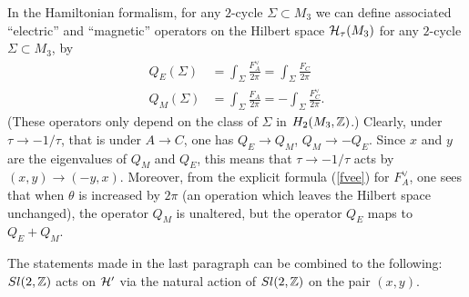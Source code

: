 In the Hamiltonian formalism, for any $2$-cycle $\Sigma\subset M_3$
we can define associated ``electric'' and ``magnetic'' operators on the
Hilbert space ${\cal H}_\tau(M_3)$ for any $2$-cycle $\Sigma\subset M_3$,
by
\begin{equation}
\begin{aligned}
Q_E(\Sigma) &= \int_\Sigma \frac{F_A^\vee}{2\pi}
=\int_\Sigma\frac{F_C}{2\pi}  \\
Q_M(\Sigma) &= \int_\Sigma \frac{F_A}{2\pi}=-\int_\Sigma \frac{F_C^\vee}{2\pi}.
\end{aligned}
\end{equation}
(These operators only depend on the class of $\Sigma$ in $H_2(M_3,{\Bbb
Z})$.)
Clearly, under $\tau\to -1/\tau$, that is under $A\to C$, one has $Q_E\to
Q_M$, $Q_M\to -Q_E$.  Since $x$ and $y$ are the eigenvalues of $Q_M$
and $Q_E$, this means that $\tau\to -1/\tau$ acts by $(x,y)\to (-y,x)$.
Moreover,
from the explicit formula (\ref{fvee}) for $F_A^\vee$, one sees that when
$\theta$ is
increased by $2\pi$ (an operation which leaves
 the Hilbert space unchanged), the operator
$Q_M$ is unaltered, but the operator $Q_E$ maps to $Q_E+Q_M$.

The statements made in the last paragraph can be combined to the following:
$Sl(2,{\Bbb Z})$ acts on ${\cal H}'$ via the natural action of $Sl(2,{\Bbb Z})$ on the
pair $(x,y)$.




